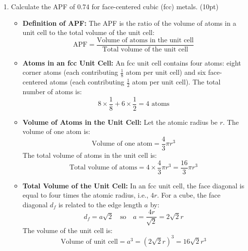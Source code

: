 \documentclass[10pt]{article}
\begin{document}
\begin{enumerate}[leftmargin=0.7cm, label=\textbf{\arabic*.}, itemsep=1em]
\begin{center}
    \end{center}

    \newpage
	\item Calculate the APF of 0.74 for face-centered cubic (fcc) metals. (10pt)
	    \begin{itemize}[leftmargin=0.5cm]
        \item \textbf{Definition of APF:} The APF is the ratio of the volume of atoms in a unit cell to the total volume of the unit cell:
        \[
        \text{APF} = \frac{\text{Volume of atoms in the unit cell}}{\text{Total volume of the unit cell}}
        \]

        \item \textbf{Atoms in an fcc Unit Cell:} An fcc unit cell contains four atoms: eight corner atoms (each contributing \( \frac{1}{8} \) atom per unit cell) and six face-centered atoms (each contributing \( \frac{1}{2} \) atom per unit cell). The total number of atoms is:
        \[
        8 \times \frac{1}{8} + 6 \times \frac{1}{2} = 4 \text{ atoms}
        \]

        \item \textbf{Volume of Atoms in the Unit Cell:} Let the atomic radius be \( r \). The volume of one atom is:
        \[
        \text{Volume of one atom} = \frac{4}{3} \pi r^3
        \]
        The total volume of atoms in the unit cell is:
        \[
        \text{Total volume of atoms} = 4 \times \frac{4}{3} \pi r^3 = \frac{16}{3} \pi r^3
        \]

        \item \textbf{Total Volume of the Unit Cell:} In an fcc unit cell, the face diagonal is equal to four times the atomic radius, i.e., \( 4r \). For a cube, the face diagonal \( d_f \) is related to the edge length \( a \) by:
        \[
        d_f = a\sqrt{2} \quad \text{so} \quad a = \frac{4r}{\sqrt{2}} = 2\sqrt{2} r
        \]
        The volume of the unit cell is:
        \[
        \text{Volume of unit cell} = a^3 = \left( 2\sqrt{2} r \right)^3 = 16\sqrt{2} r^3
        \]


\end{itemize}
\end{enumerate}
\end{document}
